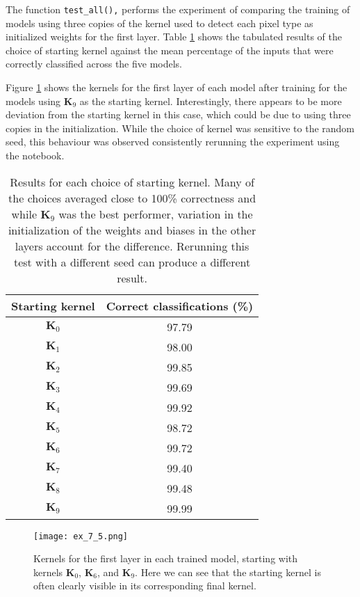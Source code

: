 \documentclass{somasmsc}
\begin{document}
\begin{exa}
The function \verb|test_all(),| performs the experiment of comparing the training of models using three copies of the kernel used to detect each pixel type as initialized weights for the first layer. Table \ref{digit:t1} shows the tabulated results of the choice of starting kernel against the mean percentage of the inputs that were correctly classified across the five models.

Figure \ref{digit:ex_7_5} shows the kernels for the first layer of each model after training for the models using $\mathbf{K}_9$ as the starting kernel. Interestingly, there appears to be more deviation from the starting kernel in this case, which could be due to using three copies in the initialization. While the choice of kernel was sensitive to the random seed, this behaviour was observed consistently rerunning the experiment using the notebook.

\begin{table}[h!]
\centering
\begin{tabular}{ |c|c| }
 \hline
  Starting kernel & Correct classifications (\%) \\
 \hline
 $\mathbf{K}_0$ & 97.79 \\
 $\mathbf{K}_1$ & 98.00 \\
 $\mathbf{K}_2$ & 99.85 \\
 $\mathbf{K}_3$ & 99.69 \\
 $\mathbf{K}_4$ & 99.92 \\
 $\mathbf{K}_5$ & 98.72 \\
 $\mathbf{K}_6$ & 99.72 \\
 $\mathbf{K}_7$ & 99.40 \\
 $\mathbf{K}_8$ & 99.48 \\
 $\mathbf{K}_9$ & 99.99 \\
 \hline
\end{tabular}
\caption{Results for each choice of starting kernel. Many of the choices averaged close to 100\% correctness and while $\mathbf{K}_9$ was the best performer, variation in the initialization of the weights and biases in the other layers account for the difference. Rerunning this test with a different seed can produce a different result.}
\label{digit:t1}
\end{table}

\begin{figure}[H]\label{digit:ex_7_5}
\begin{center}
\texttt{[image: ex\_7\_5.png]}
\end{center}
\caption{Kernels for the first layer in each trained model, starting with kernels $\mathbf{K}_0$, $\mathbf{K}_6$, and $\mathbf{K}_9$. Here we can see that the starting kernel is often clearly visible in its corresponding final kernel.}
\end{figure}
\end{exa}
\end{document}
